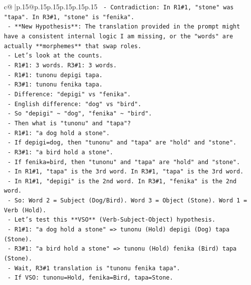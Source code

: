 \documentclass{article}
\begin{document}
{\begin{supertabular}{c@{$\;$}|p{.15\linewidth}@{}p{.15\linewidth}p{.15\linewidth}p{.15\linewidth}p{.15\linewidth}p{.15\linewidth}}
{{{\texttt{                  {-} Contradiction: In R1\#1, "stone" was "tapa". In R3\#1, "stone" is "fenika".} \\
\texttt{      {-} **New Hypothesis**: The translation provided in the prompt might have a consistent internal logic I am missing, or the "words" are actually **morphemes** that swap roles.} \\
\texttt{        {-} Let's look at the counts.} \\
\texttt{        {-} R1\#1: 3 words. R3\#1: 3 words.} \\
\texttt{        {-} R1\#1: tunonu depigi tapa.} \\
\texttt{        {-} R3\#1: tunonu fenika tapa.} \\
\texttt{        {-} Difference: "depigi" vs "fenika".} \\
\texttt{        {-} English difference: "dog" vs "bird".} \\
\texttt{        {-} So "depigi" \textasciitilde{} "dog", "fenika" \textasciitilde{} "bird".} \\
\texttt{        {-} Then what is "tunonu" and "tapa"?} \\
\texttt{        {-} R1\#1: "a dog hold a stone".} \\
\texttt{          {-} If depigi=dog, then "tunonu" and "tapa" are "hold" and "stone".} \\
\texttt{          {-} R3\#1: "a bird hold a stone".} \\
\texttt{          {-} If fenika=bird, then "tunonu" and "tapa" are "hold" and "stone".} \\
\texttt{          {-} In R1\#1, "tapa" is the 3rd word. In R3\#1, "tapa" is the 3rd word.} \\
\texttt{          {-} In R1\#1, "depigi" is the 2nd word. In R3\#1, "fenika" is the 2nd word.} \\
\texttt{          {-} So: Word 2 = Subject (Dog/Bird). Word 3 = Object (Stone). Word 1 = Verb (Hold).} \\
\texttt{          {-} Let's test this **VSO** (Verb{-}Subject{-}Object) hypothesis.} \\
\texttt{            {-} R1\#1: "a dog hold a stone" => tunonu (Hold) depigi (Dog) tapa (Stone).} \\
\texttt{            {-} R3\#1: "a bird hold a stone" => tunonu (Hold) fenika (Bird) tapa (Stone).} \\
\texttt{              {-} Wait, R3\#1 translation is "tunonu fenika tapa".} \\
\texttt{              {-} If VSO: tunonu=Hold, fenika=Bird, tapa=Stone.} \\
}}}
\end{supertabular}}
\end{document}
